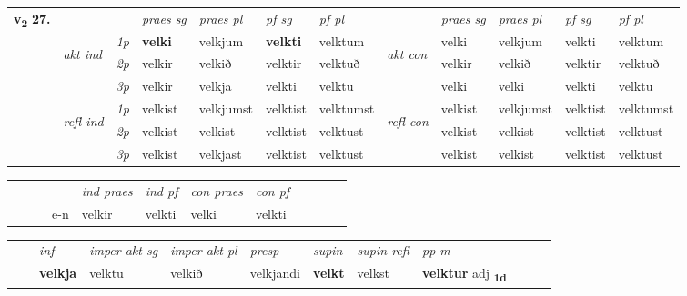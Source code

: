 \begin{tabular}{llllllllllll} \toprule
\multirow{4}{*}{{{\textbf{v{\textsubscript{2}}} \Large{\textbf{27.}}}}}  & &   &  \textit{praes sg}  & \textit{praes pl}  &\textit{ pf sg} & \textit{pf pl} &  &  \textit{praes sg}  & \textit{praes pl}  & \textit{pf sg} & \textit{pf pl } \\*
	\cmidrule{4-7} \cmidrule{9-12}
 & \multirow{3}{*}{\begin{turn}{90}\textit{akt ind}\end{turn}} & {\textit{1p}} & \textbf{velki} & velkjum    & \textbf{velkti} & velktum & \multirow{3}{*}{\begin{turn}{90}\textit{akt con}\end{turn}} &velki & velkjum & velkti & velktum\\*
& &  {\textit{2p}} &  velkir  & velkið   & velktir & velktuð & & velkir & velkið & velktir & velktuð \\*
& &  {\textit{3p}} & velkir & velkja   & velkti & velktu & & velki & velki& velkti & velktu  \\*
\cmidrule{4-7} \cmidrule{9-12}
 &\multirow{3}{*}{\begin{turn}{90}\textit{refl ind}\end{turn}} & {\textit{1p}} & velkist & velkjumst    & velktist & velktumst & \multirow{3}{*}{\begin{turn}{90}\textit{refl con}\end{turn}}  &velkist & velkjumst & velktist & velktumst\\*
 &&  {\textit{2p}} &  velkist  & velkist   & velktist & velktust & &velkist & velkist & velktist & velktust \\*
& &  {\textit{3p}} & velkist & velkjast   & velktist & velktust & & velkist & velkist& velktist & velktust  \\*
\cmidrule{4-7} \cmidrule{9-12}
\end{tabular}


\begin{tabular}{llllllllllll}
 & &  & &  \textit{ind praes} & \textit{ind pf} & \textit{con praes} & \textit{con pf} \\*
&  & & e-n & velkir & velkti & velki & velkti \\*
\cmidrule{5-9}
\end{tabular}


\begin{tabular}{llllllllllll}
 & & \textit{inf} & \textit{imper akt sg} & \textit{imper akt pl}   & \textit{presp} & \textit{supin} & \textit{supin refl} & \textit{pp m}     \\*
  & & \textbf{velkja} & velktu  & velkið   & velkjandi &  \textbf{velkt} & velkst & \textbf{velktur} adj \textbf{\textsubscript{1d}} \\*
\cmidrule{1-12}
\end{tabular}



